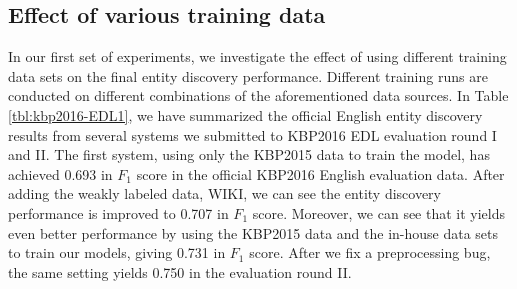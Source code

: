 \documentclass[11pt,a4paper]{article}
\begin{document}


\subsection{Effect of various training data}

In our first set of experiments, we investigate the effect of using different training data sets on the final entity discovery performance. 
Different training runs are conducted on different combinations of the aforementioned data sources.
In Table \ref{tbl:kbp2016-EDL1}, we have summarized the official English entity discovery results from several systems we submitted to KBP2016 EDL evaluation round I and II. The first system, using only the KBP2015 data to train the model, has achieved 0.693 in $F_1$ score in the official KBP2016 English evaluation data. After adding the weakly labeled data, WIKI, we can see the entity discovery performance is improved to 0.707 in  $F_1$ score. Moreover, we can see that it yields even better performance by using the KBP2015 data and the in-house data sets to train our models, giving 0.731 in $F_1$ score. After we fix a preprocessing bug, the same setting yields 0.750 in the evaluation round II. 
\end{document}
